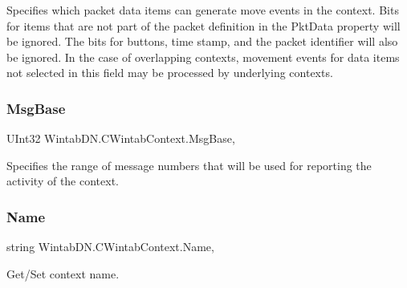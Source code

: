 Specifies which packet data items can generate move events in the context. Bits for items that are not part of the packet definition in the Pkt\+Data property will be ignored. The bits for buttons, time stamp, and the packet identifier will also be ignored. In the case of overlapping contexts, movement events for data items not selected in this field may be processed by underlying contexts. 

\mbox{\label{class_wintab_d_n_1_1_c_wintab_context_a074fcb0607df8048600719c8875b12a7}} 
\subsubsection{\texorpdfstring{Msg\+Base}{MsgBase}}
{\footnotesize\ttfamily U\+Int32 Wintab\+D\+N.\+C\+Wintab\+Context.\+Msg\+Base\hspace{0.3cm}{\ttfamily [get]}, {\ttfamily [set]}}



Specifies the range of message numbers that will be used for reporting the activity of the context. 

\mbox{\label{class_wintab_d_n_1_1_c_wintab_context_a275c652af6e326a3b8750ae5ea047237}} 
\subsubsection{\texorpdfstring{Name}{Name}}
{\footnotesize\ttfamily string Wintab\+D\+N.\+C\+Wintab\+Context.\+Name\hspace{0.3cm}{\ttfamily [get]}, {\ttfamily [set]}}



Get/\+Set context name. 

\mbox{\label{class_wintab_d_n_1_1_c_wintab_context_a3e5d1e938f9bd00d82474b670292b5a7}} 

